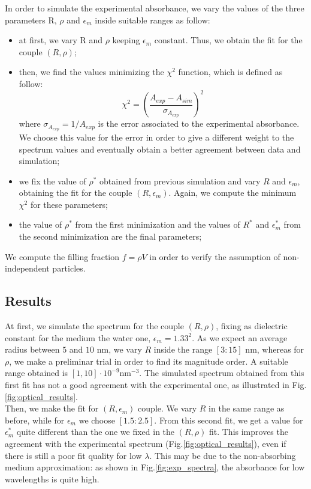 \documentclass[twocolumn]{article}
\begin{document}
\begin{multicols}{2}
In order to simulate the experimental absorbance, we vary the values of the three parameters R, $\rho$ and $\epsilon_m$ inside suitable ranges as follow:
\begin{itemize}
    \item at first, we vary R and $\rho$ keeping $\epsilon_m$ constant. Thus, we obtain the fit for the couple $(R,\rho)$; 
    \item then, we find the values minimizing the $\chi^2$ function, which is defined as follow:
        \begin{equation}
        \chi^2 = (\frac{A_{exp}-A_{sim}}{\sigma_{A_{exp}}})^2
        \end{equation}
        where $\sigma_{A_{exp}} = 1/A_{exp} $ is the error associated to the experimental absorbance. We choose this value for the error in order to give a different weight to the spectrum values and eventually obtain a better agreement between data and simulation;
   \item we fix the value of $\rho^*$ obtained from previous simulation and vary $R$ and $\epsilon_m$, obtaining the fit for the couple $(R,\epsilon_m)$. Again, we compute the minimum $\chi^2$ for these parameters;
   \item the value of $\rho^*$ from the first minimization and the values of $R^*$ and $\epsilon_m^*$ from the second minimization are the final parameters;
\end{itemize}
We compute the filling fraction $f=\rho V$ in order to verify the assumption of non-independent particles.

\subsection{Results}

At first, we simulate the spectrum for the couple $(R,\rho)$, fixing as dielectric constant for the medium the water one, $\epsilon_m = 1.33^2$. As we expect an average radius between $5$ and $10$ nm, we vary $R$ inside the range $[3:15]$ nm, whereas for $\rho$, we make a preliminar trial in order to find its magnitude order. A suitable range obtained is $[1,10]\cdot 10^{-9} \text{nm}^{-3}$. The simulated spectrum obtained from this first fit has not a good agreement with the experimental one, as illustrated in Fig.\ref{fig:optical_results}. \\
Then, we make the fit for $(R,\epsilon_m)$ couple. We vary $R$ in the same range as before, while for $\epsilon_m$ we choose $[1.5:2.5]$.
From this second fit, we get a value for $\epsilon_m^*$ quite different than the one we fixed in the $(R,\rho)$ fit. This improves the agreement with the experimental spectrum (Fig.\ref{fig:optical_results}), even if there is still a poor fit quality for low $\lambda$. This may be due to the non-absorbing medium approximation: as shown in Fig.\ref{fig:exp_spectra}, the absorbance for low wavelengths is quite high.


\end{multicols}
\end{document}
